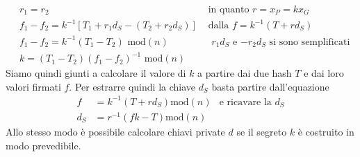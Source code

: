 \documentclass[a4paper,12pt]{tesiinfo}
\begin{document}
\begin{align*}
     &r_1 = r_2 &\text{ in quanto $r = x_P = kx_G$}\\
     &f_1 - f_2 = k^{-1} [T_1+r_1d_S - (T_2 + r_2d_S)] &\text{ dalla $f = k^{-1} (T+rd_S)$}\\
     &f_1 - f_2 = k^{-1} (T_1 - T_2)  \text{ mod$(n)$} &\text{ $r_1d_S$ e $-r_2d_S$ si sono semplificati}\\
     &k= (T_1 - T_2)(f_1 - f_2)^{-1} \text{ mod$(n)$}
\end{align*}
Siamo quindi giunti a calcolare il valore di $k$ a partire dai due hash $T$ e dai loro valori firmati $f$. Per estrarre quindi la chiave $d_S$ basta partire dall'equazione
\begin{align*}
     f &= k^{-1}(T+rd_S) \text{mod}(n) &\text{e ricavare la } d_S\\
     d_S &= r^{-1}(fk-T) \text{mod}(n) 
\end{align*}
Allo stesso modo \`e possibile calcolare chiavi private $d$ se il segreto $k$ \`e costruito in modo prevedibile.
%
%
%
%
%
%
%
%
%
%
%
%
%
%
%
\end{document}
